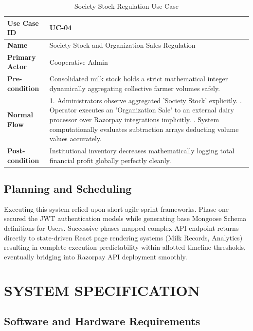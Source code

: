 \documentclass[12pt,a4paper]{report}
\begin{document}
\vspace{0.4cm}
\begin{table}[htbp]
\centering
\begin{tabular}{|p{3cm}|p{11cm}|}
\hline
\textbf{Use Case ID} & UC-04 \\ \hline
\textbf{Name} & Society Stock and Organization Sales Regulation \\ \hline
\textbf{Primary Actor} & Cooperative Admin \\ \hline
\textbf{Pre-condition} & Consolidated milk stock holds a strict mathematical integer dynamically aggregating collective farmer volumes safely. \\ \hline
\textbf{Normal Flow} & 1. Administrators observe aggregated 'Society Stock' explicitly. \newline 2. Operator executes an 'Organization Sale' to an external dairy processor over Razorpay integrations implicitly. \newline 3. System computationally evaluates subtraction arrays deducting volume values accurately. \\ \hline
\textbf{Post-condition} & Institutional inventory decreases mathematically logging total financial profit globally perfectly cleanly. \\ \hline
\end{tabular}
\caption{Society Stock Regulation Use Case}
\end{table}
\vspace{0.4cm}

\clearpage
\section{Planning and Scheduling}
Executing this system relied upon short agile sprint frameworks. Phase one secured the JWT authentication models while generating base Mongoose Schema definitions for Users. Successive phases mapped complex API endpoint returns directly to state-driven React page rendering systems (Milk Records, Analytics) resulting in complete execution predictability within allotted timeline thresholds, eventually bridging into Razorpay API deployment smoothly.

\chapter{SYSTEM SPECIFICATION}
\section{Software and Hardware Requirements}
\end{document}
